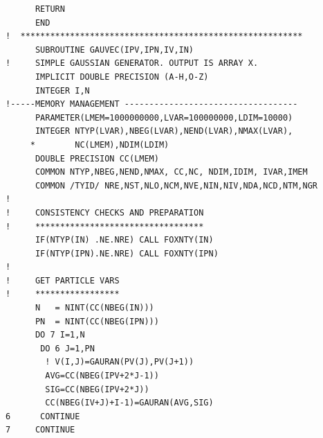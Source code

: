\begin{lstlisting}
      RETURN
      END
!  *********************************************************
      SUBROUTINE GAUVEC(IPV,IPN,IV,IN)
!     SIMPLE GAUSSIAN GENERATOR. OUTPUT IS ARRAY X.
      IMPLICIT DOUBLE PRECISION (A-H,O-Z)
      INTEGER I,N
!-----MEMORY MANAGEMENT -----------------------------------
      PARAMETER(LMEM=1000000000,LVAR=100000000,LDIM=10000)
      INTEGER NTYP(LVAR),NBEG(LVAR),NEND(LVAR),NMAX(LVAR),
     *        NC(LMEM),NDIM(LDIM)
      DOUBLE PRECISION CC(LMEM)
      COMMON NTYP,NBEG,NEND,NMAX, CC,NC, NDIM,IDIM, IVAR,IMEM
      COMMON /TYID/ NRE,NST,NLO,NCM,NVE,NIN,NIV,NDA,NCD,NTM,NGR
!
!     CONSISTENCY CHECKS AND PREPARATION
!     **********************************
      IF(NTYP(IN) .NE.NRE) CALL FOXNTY(IN)
      IF(NTYP(IPN).NE.NRE) CALL FOXNTY(IPN)
!
!     GET PARTICLE VARS
!     *****************
      N   = NINT(CC(NBEG(IN)))
      PN  = NINT(CC(NBEG(IPN)))
      DO 7 I=1,N
       DO 6 J=1,PN
        ! V(I,J)=GAURAN(PV(J),PV(J+1))
        AVG=CC(NBEG(IPV+2*J-1))
        SIG=CC(NBEG(IPV+2*J))
        CC(NBEG(IV+J)+I-1)=GAURAN(AVG,SIG)
6      CONTINUE
7     CONTINUE


\end{lstlisting}
